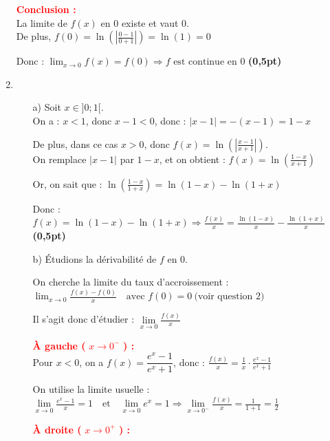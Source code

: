 \documentclass[12pt]{article}
\begin{document}
\begin{enumerate}
\textcolor{red}{\textbf{Conclusion :}}\\
La limite de \( f(x) \) en 0 existe et vaut 0.\\
De plus, \( f(0) = \ln\left( \left| \frac{0 - 1}{0 + 1} \right| \right) = \ln(1) = 0 \)

Donc : \( \lim_{x \to 0} f(x) = f(0)
\Rightarrow f \text{ est continue en } 0 \) \hfill \textbf{(0,5pt)}

\item 
\begin{enumerate}
    \item[a)] Soit \( x \in ]0 ; 1[ \).\\

    On a : \( x < 1 \), donc \( x - 1 < 0 \), donc : \( |x - 1| = -(x - 1) = 1 - x \)

    De plus, dans ce cas \( x > 0 \), donc \( f(x) = \ln\left( \left| \frac{x - 1}{x + 1} \right| \right) \).\\
    On remplace \( |x - 1| \) par \( 1 - x \), et on obtient : \( f(x) = \ln\left( \frac{1 - x}{x + 1} \right) \)

    Or, on sait que : \( \ln\left( \frac{1 - x}{1 + x} \right) = \ln(1 - x) - \ln(1 + x) \)

    Donc : \(     f(x) = \ln(1 - x) - \ln(1 + x) \Rightarrow \frac{f(x)}{x} = \frac{\ln(1 - x)}{x} - \frac{\ln(1 + x)}{x} \) \hfill \textbf{(0,5pt)}
    
    \item[b)] Étudions la dérivabilité de \( f \) en 0.

On cherche la limite du taux d’accroissement :\(\lim_{x \to 0} \frac{f(x) - f(0)}{x}
\quad \text{avec } f(0) = 0 \ \text{(voir question 2)}\)

Il s'agit donc d'étudier : \( \lim\limits_{x \to 0} \frac{f(x)}{x} \) 

\textcolor{red}{\textbf{À gauche (} \( x \to 0^- \) \textbf{) :}}\\

Pour \( x < 0 \), on a \( f(x) = \dfrac{e^x - 1}{e^x + 1} \), donc : \( \frac{f(x)}{x} = \frac{1}{x} \cdot \frac{e^x - 1}{e^x + 1} \)

On utilise la limite usuelle : \( \lim\limits_{x \to 0} \frac{e^x - 1}{x} = 1
\quad \text{et} \quad \lim\limits_{x \to 0} e^x = 1
\Rightarrow \lim\limits_{x \to 0^-} \frac{f(x)}{x} = \frac{1}{1 + 1} = \frac{1}{2} \)

\textcolor{red}{\textbf{À droite (} \( x \to 0^+ \) \textbf{) :}}\\


\end{enumerate}
\end{enumerate}
\end{document}
